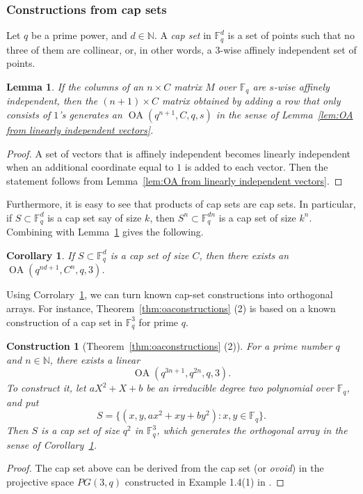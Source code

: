 \documentclass[11pt, letterpaper]{article}
\newtheorem{construction}{Construction}
\newtheorem{lemma}{Lemma}
\newtheorem{corollary}{Corollary}
\theoremstyle{definition}
\theoremstyle{remark}
\DeclareMathOperator{\OA}{OA}
\newcommand{\N}{\mathbb{N}}
\begin{document}
\begin{appendices}
\subsubsection{Constructions from cap sets}
Let $q$ be a prime power, and $d\in \N$. A \emph{cap set} in $\mathbb{F}_q^d$ is a set of points such that no three of them are collinear, or, in other words, a $3$-wise affinely independent set of points.

\begin{lemma}\label{lem:OA from affinely independent vectors}
    If the columns of an $n \times C$ matrix $M$ over $\mathbb{F}_q$ are $s$-wise affinely independent, then the $(n+1) \times C$ matrix obtained by adding a row that only consists of $1$'s generates an $\OA(q^{n+1}, C, q, s)$ in the sense of Lemma~\ref{lem:OA from linearly independent vectors}.
\end{lemma}
\begin{proof}
    A set of vectors that is affinely independent becomes linearly independent when an additional coordinate equal to $1$ is added to each vector. Then the statement follows from Lemma~\ref{lem:OA from linearly independent vectors}.
\end{proof}

Furthermore, it is easy to see that products of cap sets are cap sets. In particular, if $S \subset \mathbb{F}_q^d$ is a cap set say of size $k$, then $S^n \subset \mathbb{F}_q^{dn}$ is a cap set of size $k^n$. Combining with Lemma~\ref{lem:OA from affinely independent vectors} gives the following.

\begin{corollary}\label{cor:OA from capset}
    If $S \subset \mathbb{F}_q^d$ is a cap set of size $C$, then there exists an $\OA(q^{nd+1},C^n,q,3)$.
\end{corollary}

Using Corrolary~\ref{cor:OA from capset}, we can turn known cap-set constructions into orthogonal arrays. For instance, Theorem~\ref{thm:oaconstructions} (2) is based on a known construction of a cap set in $\mathbb{F}_q^3$ for prime $q$.

\begin{construction}[Theorem~\ref{thm:oaconstructions} (2)]
    For a prime number $q$ and $n\in \N$, there exists a linear \[
    \OA(q^{3n+1},q^{2n},q,3).
    \] To construct it, let $aX^2 + X + b$ be an irreducible degree two polynomial over $\mathbb{F}_q$, and put \[
    S = \{(x, y, ax^2 + xy + by^2)\colon x,y\in \mathbb{F}_q\}.
    \] Then $S$ is a cap set of size $q^2$ in $\mathbb{F}_q^3$, which generates the orthogonal array in the sense of Corollary~\ref{cor:OA from capset}.
\end{construction}
\begin{proof}
    The cap set above can be derived from the cap set (or \emph{ovoid}) in the projective space $PG(3,q)$ constructed in Example 1.4(1) in \cite{keefe96}.
\end{proof}


\end{appendices}
\end{document}
